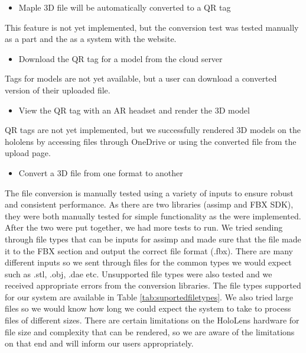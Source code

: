 \begin{itemize} \item Maple 3D file will be automatically converted to a QR tag \end{itemize}
    \hspace{7mm}
    This feature is not yet implemented, but the conversion test was tested manually as a part and the as a system with the website.

\begin{itemize} \item Download the QR tag for a model from the cloud server \end{itemize}
    \hspace{7mm}
    Tags for models are not yet available, but a user can download a converted version of their uploaded file.

\begin{itemize} \item View the QR tag with an AR headset and render the 3D model \end{itemize}
    \hspace{7mm} 
    QR tags are not yet implemented, but we successfully rendered 3D models on the hololens by accessing files through OneDrive or using the converted file from the upload page.

\begin{itemize} \item Convert a 3D file from one format to another 
    \end{itemize}
    \hspace{7mm}
    The file conversion is manually tested using a variety of inputs to ensure robust and consistent performance. As there are two libraries (assimp and FBX SDK), they were both manually tested for simple functionality as the were implemented. After the two were put together, we had more tests to run. We tried sending through file types that can be inputs for assimp and made sure that the file made it to the FBX section and output the correct file format (.fbx). There are many different inputs so we sent through files for the common types we would expect such as .stl, .obj, .dae etc. Unsupported file types were also tested and we received appropriate errors from the conversion libraries. The file types supported for our system are available in Table \ref{tab:suportedfiletypes}. We also tried large files so we would know how long we could expect the system to take to process files of different sizes. There are certain limitations on the HoloLens hardware for file size and complexity that can be rendered, so we are aware of the limitations on that end and will inform our users appropriately. 
    
